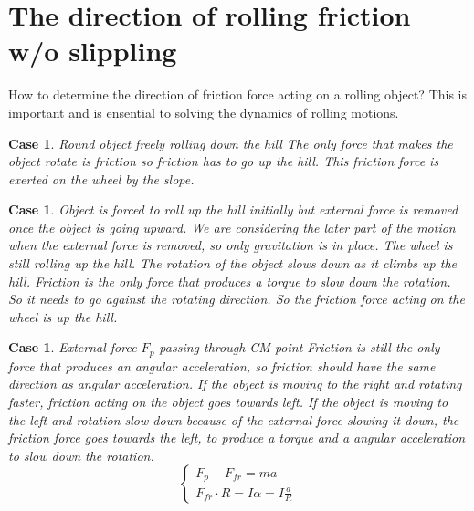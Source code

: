 \documentclass{article}
\newtheorem{case}[theorem]{Case}
\begin{document}
\part{The direction of rolling friction w/o slippling}

How to determine the direction of friction force acting on a rolling object?
This is important and is ensential to solving the dynamics of rolling
motions.

\begin{case}
Round object freely rolling down the hill\newline
\newline
The only force that makes the object rotate is friction so friction has to
go up the hill. This friction force is exerted on the wheel by the slope.


\end{case}

\newpage

\begin{case}
Object is forced to roll up the hill initially but external force is removed
once the object is going upward. We are considering the later part of the
motion when the external force is removed, so only gravitation is in place.
The wheel is still rolling up the hill.\newline
\newline
The rotation of the object slows down as it climbs up the hill. Friction is
the only force that produces a torque to slow down the rotation. So it needs
to go against the rotating direction. So the friction force acting on the
wheel is up the hill.


\end{case}

\newpage

\begin{case}
External force $F_{p}$ passing through CM point\newline
\newline
Friction is still the only force that produces an angular acceleration, so
friction should have the same direction as angular acceleration. If the
object is moving to the right and rotating faster, friction acting on the
object goes towards left. If the object is moving to the left and rotation
slow down because of the external force slowing it down, the friction force
goes towards the left, to produce a torque and a angular acceleration to
slow down the rotation.\newline
%
\[
\left\{ 
\begin{array}{c}
F_{p}-F_{fr}=ma \\ 
F_{fr}\cdot R=I\alpha =I\frac{a}{R}%
\end{array}%
\right. 
\]
\end{case}
\end{document}

